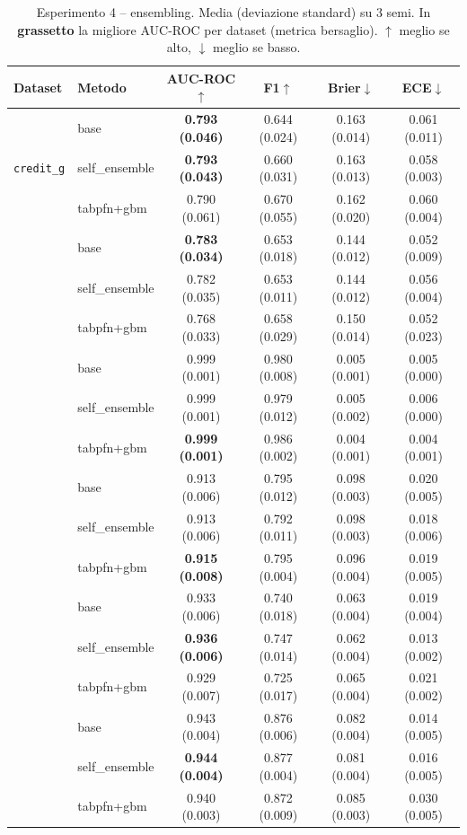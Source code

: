 \begin{table}[h]
\centering
\caption{Esperimento 4 -- ensembling. Media (deviazione standard) su $3$ semi.
In \textbf{grassetto} la migliore AUC-ROC per dataset (metrica bersaglio).
$\uparrow$ meglio se alto, $\downarrow$ meglio se basso.}
\label{tab:ensemble}
\small
\setlength{\tabcolsep}{4pt}
\begin{tabular}{llcccc}
\toprule
Dataset & Metodo & AUC-ROC$\uparrow$ & F1$\uparrow$ & Brier$\downarrow$ & ECE$\downarrow$ \\
\midrule
\multirow{3}{*}{\texttt{credit\_g}}
 & base          & \textbf{0.793 (0.046)} & 0.644 (0.024) & 0.163 (0.014) & 0.061 (0.011) \\
 & self\_ensemble& \textbf{0.793 (0.043)} & 0.660 (0.031) & 0.163 (0.013) & 0.058 (0.003) \\
 & tabpfn+gbm    & 0.790 (0.061) & 0.670 (0.055) & 0.162 (0.020) & 0.060 (0.004) \\
\addlinespace
\multirow{3}{*}{\texttt{blood\_transfusion}}
 & base          & \textbf{0.783 (0.034)} & 0.653 (0.018) & 0.144 (0.012) & 0.052 (0.009) \\
 & self\_ensemble& 0.782 (0.035) & 0.653 (0.011) & 0.144 (0.012) & 0.056 (0.004) \\
 & tabpfn+gbm    & 0.768 (0.033) & 0.658 (0.029) & 0.150 (0.014) & 0.052 (0.023) \\
\addlinespace
\multirow{3}{*}{\texttt{thyroid}}
 & base          & 0.999 (0.001) & 0.980 (0.008) & 0.005 (0.001) & 0.005 (0.000) \\
 & self\_ensemble& 0.999 (0.001) & 0.979 (0.012) & 0.005 (0.002) & 0.006 (0.000) \\
 & tabpfn+gbm    & \textbf{0.999 (0.001)} & 0.986 (0.002) & 0.004 (0.001) & 0.004 (0.001) \\
\addlinespace
\multirow{3}{*}{\texttt{adult}}
 & base          & 0.913 (0.006) & 0.795 (0.012) & 0.098 (0.003) & 0.020 (0.005) \\
 & self\_ensemble& 0.913 (0.006) & 0.792 (0.011) & 0.098 (0.003) & 0.018 (0.006) \\
 & tabpfn+gbm    & \textbf{0.915 (0.008)} & 0.795 (0.004) & 0.096 (0.004) & 0.019 (0.005) \\
\addlinespace
\multirow{3}{*}{\texttt{bank\_marketing}}
 & base          & 0.933 (0.006) & 0.740 (0.018) & 0.063 (0.004) & 0.019 (0.004) \\
 & self\_ensemble& \textbf{0.936 (0.006)} & 0.747 (0.014) & 0.062 (0.004) & 0.013 (0.002) \\
 & tabpfn+gbm    & 0.929 (0.007) & 0.725 (0.017) & 0.065 (0.004) & 0.021 (0.002) \\
\addlinespace
\multirow{3}{*}{\texttt{magic\_telescope}}
 & base          & 0.943 (0.004) & 0.876 (0.006) & 0.082 (0.004) & 0.014 (0.005) \\
 & self\_ensemble& \textbf{0.944 (0.004)} & 0.877 (0.004) & 0.081 (0.004) & 0.016 (0.005) \\
 & tabpfn+gbm    & 0.940 (0.003) & 0.872 (0.009) & 0.085 (0.003) & 0.030 (0.005) \\
\bottomrule
\end{tabular}
\end{table}

